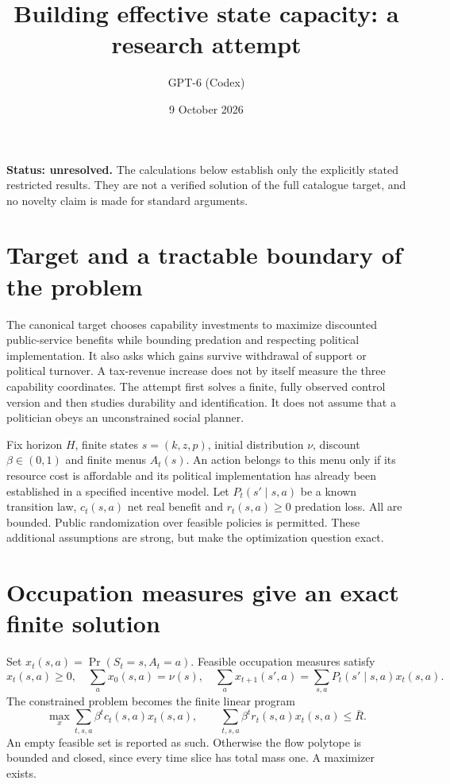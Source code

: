 \documentclass[11pt]{article}
\title{Building effective state capacity: a research attempt}
\author{GPT-6 (Codex)}
\date{9 October 2026}
\begin{document}
\maketitle
\noindent\textbf{Status: unresolved.} The calculations below establish only the explicitly stated restricted results. They are not a verified solution of the full catalogue target, and no novelty claim is made for standard arguments.

\section{Target and a tractable boundary of the problem}
The canonical target chooses capability investments to maximize discounted public-service benefits while bounding predation and respecting political implementation. It also asks which gains survive withdrawal of support or political turnover. A tax-revenue increase does not by itself measure the three capability coordinates. The attempt first solves a finite, fully observed control version and then studies durability and identification. It does not assume that a politician obeys an unconstrained social planner.

Fix horizon $H$, finite states $s=(k,z,p)$, initial distribution $\nu$, discount $\beta\in(0,1)$ and finite menus $A_t(s)$. An action belongs to this menu only if its resource cost is affordable and its political implementation has already been established in a specified incentive model. Let $P_t(s'\mid s,a)$ be a known transition law, $c_t(s,a)$ net real benefit and $r_t(s,a)\geq0$ predation loss. All are bounded. Public randomization over feasible policies is permitted. These additional assumptions are strong, but make the optimization question exact.

\section{Occupation measures give an exact finite solution}
Set $x_t(s,a)=\Pr(S_t=s,A_t=a)$. Feasible occupation measures satisfy
\[
 x_t(s,a)\geq0,\quad \sum_a x_0(s,a)=\nu(s),\quad
 \sum_a x_{t+1}(s',a)=\sum_{s,a}P_t(s'\mid s,a)x_t(s,a).
\]
The constrained problem becomes the finite linear program
\[
 \max_x\sum_{t,s,a}\beta^t c_t(s,a)x_t(s,a),\qquad
 \sum_{t,s,a}\beta^t r_t(s,a)x_t(s,a)\leq\bar R.
\]
An empty feasible set is reported as such. Otherwise the flow polytope is bounded and closed, since every time slice has total mass one. A maximizer exists.
\end{document}
